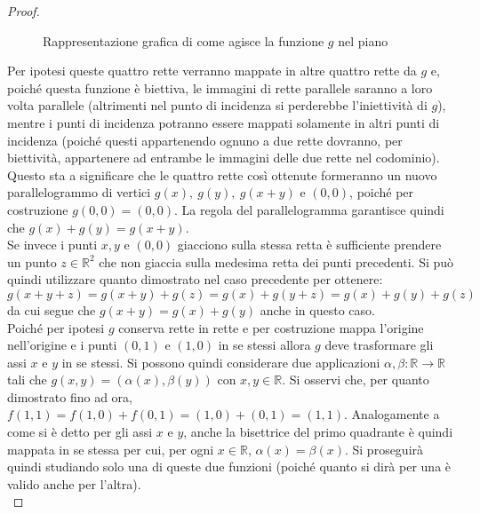 \begin{proof}
\begin{figure}[h!]
\begin{tikzpicture}[scale=0.8]
	\end{tikzpicture}
	\caption{Rappresentazione grafica di come agisce la funzione $g$ nel piano}
	\label{Fig:PianoLinGen}
	\end{figure}
	Per ipotesi queste quattro rette verranno mappate in altre quattro rette da $g$ e, poiché questa funzione è biettiva, le immagini di rette parallele saranno a loro volta parallele (altrimenti nel punto di incidenza si perderebbe l'iniettività di $g$), mentre i punti di incidenza potranno essere mappati solamente in altri punti di incidenza (poiché questi appartenendo ognuno a due rette dovranno, per biettività, appartenere ad entrambe le immagini delle due rette nel codominio). Questo sta a significare che le quattro rette così ottenute formeranno un nuovo parallelogrammo di vertici $g(x),\ g(y),\ g(x+y)$ e $(0,0)$, poiché per costruzione $g(0,0)=(0,0)$. La regola del parallelogramma garantisce quindi che $g(x)+g(y)=g(x+y)$.\\
	Se invece i punti $x,y$ e $(0,0)$ giacciono sulla stessa retta è sufficiente prendere un punto $z\in \mathbb{R}^2$ che non giaccia sulla medesima retta dei punti precedenti. Si può quindi utilizzare quanto dimostrato nel caso precedente per ottenere:
	\begin{equation*}
		g(x+y+z)=g(x+y)+g(z)= g(x)+g(y+z)=g(x)+g(y)+g(z)
	\end{equation*}
	da cui segue che $g(x+y)=g(x)+g(y)$ anche in questo caso.\\

    Poiché per ipotesi $g$ conserva rette in rette e per costruzione mappa l'origine nell'origine e i punti $(0,1)$ e $(1,0)$ in se stessi allora $g$ deve trasformare gli assi $x$ e $y$ in se stessi. Si possono quindi considerare due applicazioni $\alpha,\beta:\mathbb{R} \rightarrow\mathbb{R} $ tali che $g(x,y)=(\alpha(x),\beta(y))$ con  $x,y\in\mathbb{R}$. Si osservi che, per quanto dimostrato fino ad ora, $f(1,1)=f(1,0)+f(0,1)=(1,0)+(0,1)=(1,1)$. Analogamente a come si è detto per gli assi $x$ e $y$, anche la bisettrice del primo quadrante è quindi mappata in se stessa per cui, per ogni $x\in\mathbb{R}$, $\alpha(x)=\beta(x)$. Si proseguirà quindi studiando solo una di queste due funzioni (poiché quanto si dirà per una è valido anche per l'altra).\\


\end{proof}
